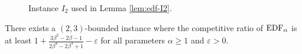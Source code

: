 \begin{figure}[ht]\centering
{}
\caption{Instance $I_2$ used in Lemma \ref{lem:edf-I2}.}
\label{img:edf-I2}
\end{figure}

\begin{lemma}\label{lem:edf-I3}
There exists a $(2,3)$-bounded instance where the competitive ratio of $\text{EDF}_\alpha$
is at least $1 + \frac{3\beta^2 - 2\beta - 1}{2\beta^4 - 2\beta^3 + 1} -
\varepsilon$ for all parameters $\alpha \geq 1$ and $\varepsilon > 0$.
\end{lemma}


